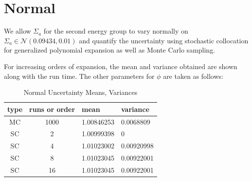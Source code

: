 \documentclass[11pt]{article} %
\begin{document}
\newpage
\section{Normal}
We allow $\Sigma_a$ for the second energy group to vary normally on $\Sigma_a\in\mathcal{N}(0.09434,0.01)$ and quantify the uncertainty using stochastic collocation for generalized polynomial expansion as well as Monte Carlo sampling.

For increasing orders of expansion, the mean and variance obtained are shown along with the run time.  The other parameters for $\phi$ are taken as follows:
\begin{table}[h!]
\begin{center}
\begin{tabular}{c c|l l}
type & runs or order & mean & variance\\ \hline
MC & 1000 & 1.00846253 & 0.0068809\\
SC & 2 & 1.00999398 & 0 \\
SC & 4 & 1.01023002 & 0.00920998  \\
SC & 8 & 1.01023045 & 0.00922001 \\
SC & 16 & 1.01023045 & 0.00922001 
\end{tabular}
\end{center}
\caption{Normal Uncertainty Means, Variances}
\end{table}
\end{document}
